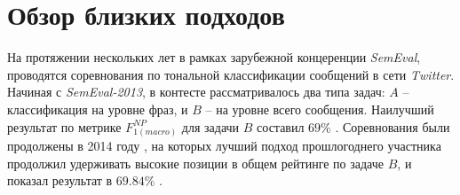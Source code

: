 \section{Обзор близких подходов}
    \label{sec:review}








    На протяжении нескольких лет в рамках зарубежной концеренции {\it SemEval},
    проводятся соревнования по тональной классификации сообщений в сети {\it Twitter}.
    Начиная с {\it SemEval-2013}, в контесте рассматривалось два типа задач: $A$
    -- классификация на уровне фраз, и $B$ -- на уровне всего сообщения.
    Наилучший результат по метрике $F_{1(macro)}^{NP}$ для задачи $B$ составил
    $69\%$ \cite{semEval2013}.
    Соревнования были продолжены в 2014 году \cite{semEval2014}, на которых
    лучший подход прошлогоднего участника продолжил удерживать высокие позиции в
    общем рейтинге по задаче $B$, и показал результат в $69.84\%$
    \cite{modernApproach}.

